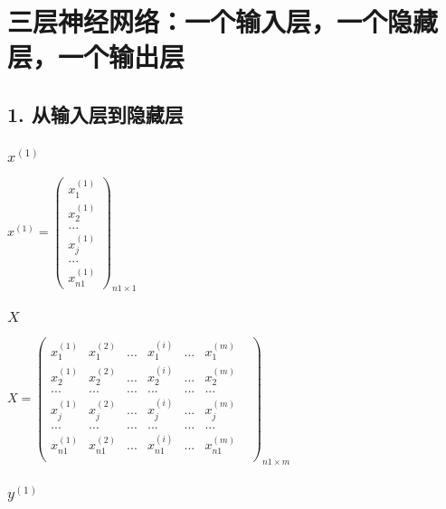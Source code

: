 \documentclass[
]{article}
\date{}
\begin{document}
\hypertarget{header-n0}{%
\section{三层神经网络：一个输入层，一个隐藏层，一个输出层}\label{header-n0}}

\hypertarget{header-n2}{%
\subsection{1. 从输入层到隐藏层}\label{header-n2}}

\hypertarget{header-n3}{%
\subsubsection{\texorpdfstring{\(x^{(1)}\)}{x\^{}\{(1)\}}}\label{header-n3}}

\(x^{(1)} = {
    \begin{pmatrix}
      x^{(1)}_{1}\\
      x^{(1)}_{2} \\
      ...\\
      x^{(1)}_{j}\\
      ...\\
      x^{(1)}_{n1}
    \end{pmatrix}
  }_{n1×1}\)

\hypertarget{header-n5}{%
\subsubsection{\texorpdfstring{\(X\)}{X}}\label{header-n5}}

\(X={\begin{pmatrix}
      x^{(1)}_{1} & x^{(2)}_{1} &...& x^{(i)}_{1} &...& x^{(m)}_{1} & \\
      x^{(1)}_{2} & x^{(2)}_{2} &...& x^{(i)}_{2} &...& x^{(m)}_{2} & \\
      ...&...&...&...&...&...\\
      x^{(1)}_{j} & x^{(2)}_{j} &...& x^{(i)}_{j} &...& x^{(m)}_{j} & \\
      ...&...&...&...&...&...\\
      x^{(1)}_{n1} & x^{(2)}_{n1} &...& x^{(i)}_{n1} &...& x^{(m)}_{n1} & \\
    \end{pmatrix}}_{n1×m}\)

\hypertarget{header-n7}{%
\subsubsection{\texorpdfstring{\(y^{(1)}\)}{y\^{}\{(1)\}}}\label{header-n7}}
\end{document}
